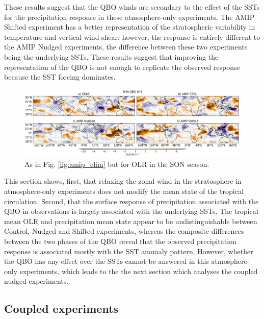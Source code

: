 These results suggest that the QBO winds are secondary to the effect of the SSTs for the precipitation response in these atmosphere-only experiments. The AMIP Shifted experiment has a better representation of the stratospheric variability in temperature and vertical wind shear, however, the response is entirely different to the AMIP Nudged experiments, the difference between these two experiments being the underlying SSTs. These results suggest that improving the representation of the QBO is not enough to replicate the observed response because the SST forcing dominates. 

\begin{figure}[t!]
\centering
 \includegraphics[width=\linewidth]{figures/olr_amip_sonqbowqboe.png}
\caption[SON OLR response in atmosphere-only experiments]{As in Fig. \ref{fig:amip_clim} but for OLR in the SON season. }
\label{fig:amip_son_olr}
\end{figure}

This section shows, first, that relaxing the zonal wind in the stratosphere in atmosphere-only experiments does not modify the mean state of the tropical circulation. Second, that the surface response of precipitation associated with the QBO in observations is largely associated with the underlying SSTs. The tropical mean OLR and precipitation mean state appear to be undistinguishable between Control, Nudged and Shifted experiments, whereas the composite differences between the two phases of the QBO reveal that the observed precipitation response is associated mostly with the SST anomaly pattern. However, whether the QBO has any effect over the SSTs cannot be answered in this atmosphere-only experiments, which leads to the the next section which analyses the coupled nudged experiments. 

\subsection{Coupled experiments}




